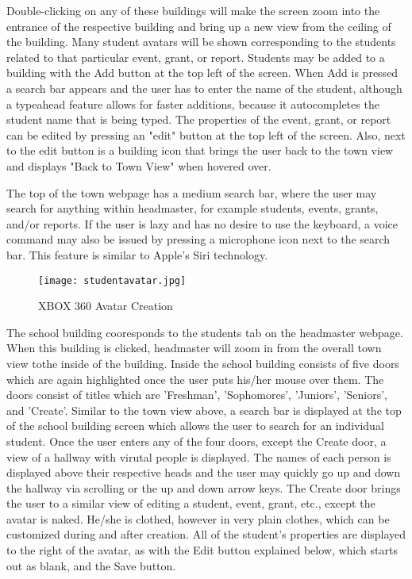 \documentclass[11pt]{article}
\begin{document}
Double-clicking on any of these buildings will make the screen zoom into the entrance of the respective building and bring up a new view from the ceiling of the building. Many student avatars will be shown corresponding to the students related to that particular event, grant, or report. Students may be added to a building with the Add button at the top left of the screen. When Add is pressed a search bar appears and the user has to enter the name of the student, although a typeahead feature allows for faster additions, because it autocompletes the student name that is being typed. The properties of the event, grant, or report can be edited by pressing an "edit" button at the top left of the screen. Also, next to the edit button is a building icon that brings the user back to the town view and displays "Back to Town View" when hovered over.

 The top of the town webpage has a medium search bar, where the user may search for anything within headmaster, for example students, events, grants, and/or reports. If the user is lazy and has no desire to use the keyboard, a voice command may also be issued by pressing a microphone icon next to the search bar. This feature is similar to Apple's Siri technology. 

\begin{figure}
\centering
\texttt{[image: studentavatar.jpg]}
\caption{XBOX 360 Avatar Creation}
\label{avatar}
\end{figure}

The school building cooresponds to the students tab on the headmaster webpage. When this building is clicked, headmaster will zoom in from the overall town view tothe inside of the building. Inside the school building consists of five doors which are again highlighted once the user puts his/her mouse over them. The doors consist of titles which are 'Freshman', 'Sophomores', 'Juniors', 'Seniors', and 'Create'. Similar to the town view above, a search bar is displayed at the top of the school building screen which allows the user to search for an individual student. Once the user enters any of the four doors, except the Create door, a view of a hallway with virutal people is displayed. The names of each person is displayed above their respective heads and the user may quickly go up and down the hallway via scrolling or the up and down arrow keys. The Create door brings the user to a similar view of editing a student, event, grant, etc., except the avatar is naked. He/she is clothed, however in very plain clothes, which can be customized during and after creation. All of the student's properties are displayed to the right of the avatar, as with the Edit button explained below, which starts out as blank, and the Save button.
\end{document}
